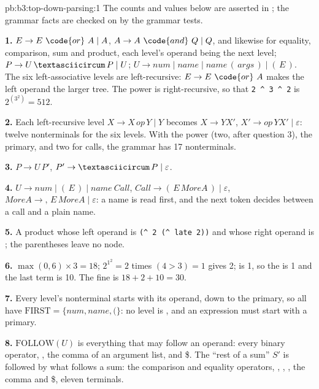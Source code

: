 \begin{solution}{pb:b3:top-down-parsing:1}
The counts and values below are asserted in ; the grammar facts are checked on  by the grammar tests.

\textbf{1.} $E \to E\ \code{or}\ A \mid A$, $A \to A\ \code{and}\ Q \mid Q$, and likewise for equality, comparison, sum and product, each level's operand being the next level; $P \to U\,\textasciicircum\,P \mid U$; $U \to \mathit{num} \mid \mathit{name} \mid \mathit{name}\,(\,\mathit{args}\,) \mid (\,E\,)$. The six left-associative levels are left-recursive: $E \to E\ \code{or}\ A$ makes the left operand the larger tree. The power is right-recursive, so that \texttt{2 \textasciicircum{} 3 \textasciicircum{} 2} is $2^{(3^2)} = 512$.

\textbf{2.} Each left-recursive level $X \to X\,\mathit{op}\,Y \mid Y$ becomes $X \to Y X'$, $X' \to \mathit{op}\,Y X' \mid \varepsilon$: twelve nonterminals for the six levels. With the power (two, after question 3), the primary, and two for calls, the grammar has 17 nonterminals.

\textbf{3.} $P \to U\,P'$, $P' \to \textasciicircum\,P \mid \varepsilon$.

\textbf{4.} $U \to \mathit{num} \mid (\,E\,) \mid \mathit{name}\ \mathit{Call}$, $\mathit{Call} \to (\,E\,\mathit{MoreA}\,) \mid \varepsilon$, $\mathit{MoreA} \to ,\,E\,\mathit{MoreA} \mid \varepsilon$: a name is read first, and the next token decides between a call and a plain name.

\textbf{5.} A product whose left operand is \texttt{(\textasciicircum{} 2 (\textasciicircum{} late 2))} and whose right operand is ; the parentheses leave no node.

\textbf{6.} $\max(0, 6) \times 3 = 18$; $2^{1^2} = 2$ times $(4 > 3) = 1$ gives 2;  is 1, so the  is 1 and the last term is 10. The fine is $18 + 2 + 10 = 30$.

\textbf{7.} Every level's nonterminal starts with its operand, down to the primary, so all have $\mathrm{FIRST} = \{\mathit{num}, \mathit{name}, (\}$: no level is , and an expression must start with a primary.

\textbf{8.} $\mathrm{FOLLOW}(U)$ is everything that may follow an operand: every binary operator, \code{)}, the comma of an argument list, and \$. The ``rest of a sum'' $S'$ is followed by what follows a sum: the comparison and equality operators, , , \code{)}, the comma and \$, eleven terminals.


\end{solution}
